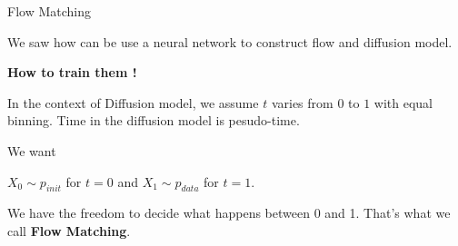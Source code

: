 \documentclass[aspectratio=169,xcolor=dvipsnames,svgnames,x11names,fleqn]{beamer}
\begin{document}
\begin{frame}{Flow Matching}

    \small

    We saw how can be use a neural network to construct flow and diffusion model.

    
    \vspace{10pt}
    
    \textbf{How to train them !}
    

    \vspace{10pt}

        In the context of Diffusion model, we assume $t$ varies from $0$ to $1$ with equal binning. Time in the diffusion model is pesudo-time.

    \vspace{10pt}

    We want

    \vspace{10pt}

    \begin{tcolorbox}[enhanced, sharp corners,
    boxrule=0.0pt, 
    leftrule = 2mm,
    colframe=white!80!Green, colback=dustyGreen!20,
    notitle,
    left=1mm ]

    $X_0 \sim p_{init}$ for $t = 0$ and $X_1 \sim p_{data}$ for $t = 1$. 

    \end{tcolorbox}

    We have the freedom to decide what happens between 0 and 1. That's what we call \textbf{Flow Matching}.

\end{frame}
\end{document}
